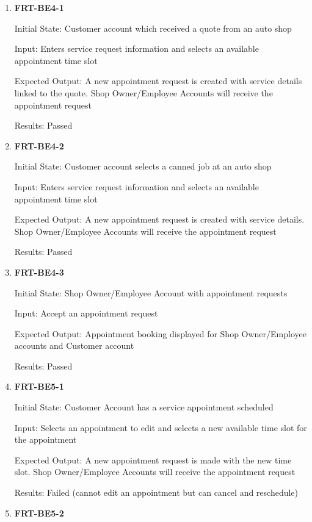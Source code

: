 \documentclass[12pt, titlepage]{article}
\begin{document}
\begin{enumerate}

	\item \textbf{FRT-BE4-1}

	      Initial State: Customer account which received a quote from an auto shop

	      Input: Enters service request information and selects an available appointment time slot

	      Expected Output: A new appointment request is created with service details linked to the quote.
	      Shop Owner/Employee Accounts will receive the appointment request

	      Results: Passed

	\item \textbf{FRT-BE4-2}

	      Initial State: Customer account selects a canned job at an auto shop

	      Input: Enters service request information and selects an available appointment time slot

	      Expected Output: A new appointment request is created with service details. Shop Owner/Employee
	      Accounts will receive the appointment request

	      Results: Passed

	\item \textbf{FRT-BE4-3}

	      Initial State: Shop Owner/Employee Account with appointment requests

	      Input: Accept an appointment request

	      Expected Output: Appointment booking displayed for Shop Owner/Employee accounts and Customer
	      account

	      Results: Passed

	\item \textbf{FRT-BE5-1}

	      Initial State: Customer Account has a service appointment scheduled

	      Input: Selects an appointment to edit and selects a new available time slot for the appointment

	      Expected Output: A new appointment request is made with the new time slot. Shop Owner/Employee
	      Accounts will receive the appointment request

	      Results: Failed (cannot edit an appointment but can cancel and reschedule)

	\item \textbf{FRT-BE5-2}


\end{enumerate}
\end{document}
